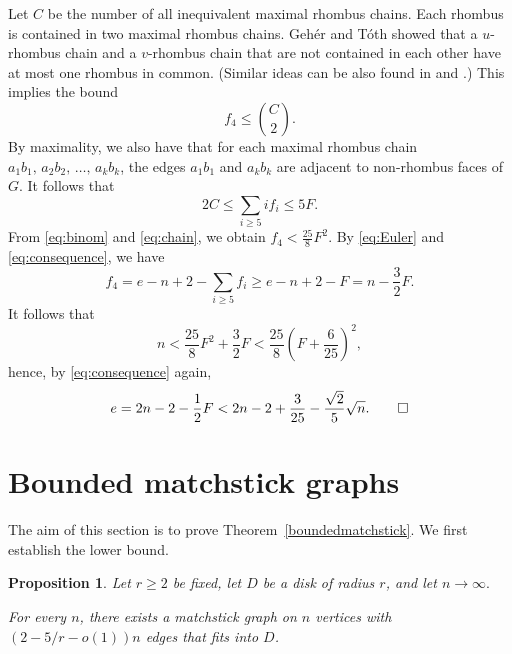 \documentclass[12pt]{article}
\theoremstyle{plain}
\newtheorem{proposition}[theorem]{Proposition}
\theoremstyle{definition}
\theoremstyle{remark}
\begin{document}
Let $C$ be the number of all inequivalent maximal rhombus chains.
Each rhombus is contained in two maximal rhombus chains. Geh\'er and T\'oth \cite[Claim 5]{GT24} showed that a $u$-rhombus chain and a $v$-rhombus chain that are not contained in each other have at most one rhombus in common. (Similar ideas can be also found in \cite{KS92} and \cite{K93}.)
This implies the bound
\begin{equation}\label{eq:binom}
f_4\leq\binom{C}{2}.
\end{equation}
By maximality, we also have that for each maximal rhombus chain $a_1b_1, \, a_2b_2, \, \dots, \, a_kb_k$, the edges $a_1b_1$ and $a_kb_k$ are adjacent to non-rhombus faces of $G$.
It follows that
\begin{equation}\label{eq:chain}
2C\leq\sum_{i\geq 5}if_i\leq 5F.
\end{equation}
From \eqref{eq:binom} and \eqref{eq:chain}, we obtain $f_4 < \frac{25}{8}F^2$.
By \eqref{eq:Euler} and \eqref{eq:consequence}, we have
\[ f_4 = e-n+2-\sum_{i\geq 5}f_i \geq e-n+2-F = n-\frac32 F. \]
It follows that
\[n < \frac{25}{8}F^2+\frac32 F < \frac{25}{8}\left(F+\frac{6}{25}\right)^2,\]
hence, by \eqref{eq:consequence} again,
\[e = 2n-2-\frac12 F < 2n - 2 +\frac{3}{25} -\frac{\sqrt{2}}{5}\sqrt{n}.\qed\]


\section{Bounded matchstick graphs}
The aim of this section is to prove Theorem~\ref{boundedmatchstick}.
We first establish the lower bound.

\begin{proposition} \label{lower_bound}
Let $r \geq 2$ be fixed, let $D$ be a disk of radius $r$, and let $n\rightarrow\infty.$ 

For every $n$, there exists a matchstick graph on $n$ vertices with $\left(2- 5/r -o(1) \right)n$ edges that fits into $D$.
\end{proposition}
\end{document}
